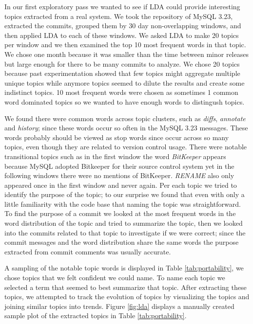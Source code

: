 \documentclass[times, 10pt,twocolumn]{article}
\newcommand{\shrinkit}{\vspace*{-.3em}}
\begin{document}

\shrinkit
{}
\shrinkit

In our first exploratory pass we wanted to see if LDA could provide
interesting topics extracted from a real system. We took the
repository of MySQL 3.23, extracted the commits, grouped them by 30
day non-overlapping windows, and then applied LDA to each of these
windows. We asked LDA to make 20 topics per window and we then
examined the top 10 most frequent words in that topic.  We chose one
month because it was smaller than the time between minor releases but
large enough for there to be many commits to analyze. We chose 20
topics because past experimentation showed that few topics might
aggregate multiple unique topics while anymore topics seemed to dilute
the results and create some indistinct topics. 10 most frequent words
were chosen as sometimes 1 common word dominated topics so we wanted
to have enough words to distingush topics.


We found there were common words across topic clusters, such as
\emph{diffs}, \emph{annotate} and \emph{history}; since these words
occur so often in the MySQL 3.23 messages. These words probably should
be viewed as stop words since occur across so many topics, even though
they are related to version control usage.  There were notable
transitional topics such as in the first window the word
\emph{BitKeeper} appears because MySQL adopted Bitkeeper for their
source control system yet in the following windows there were no
mentions of BitKeeper. \emph{RENAME} also only appeared once in the
first window and never again. Per each topic we tried to identify the
purpose of the topic; to our surprise we found that even with only a
little familiarity with the code base that naming the topic was
straightforward. To find the purpose of a commit we looked at the most
frequent words in the word distribution of the topic and tried to
summarize the topic, then we looked into the commits related to that
topic to investigate if we were correct; since the commit messages and
the word distribution share the same words the purpose extracted from
commit comments was usually accurate.

A sampling of the notable topic words is displayed in Table
\ref{tab:portability}, we chose topics that we felt confident we could
name.  To name each topic we selected a term that seemed to best
summarize that topic.  After extracting these topics, we attempted to
track the evolution of topics by visualizing the topics and joining
similar topics into trends.  Figure \ref{fig:lda} displays a manually
created sample plot of the extracted topics in Table
\ref{tab:portability}.
\end{document}
